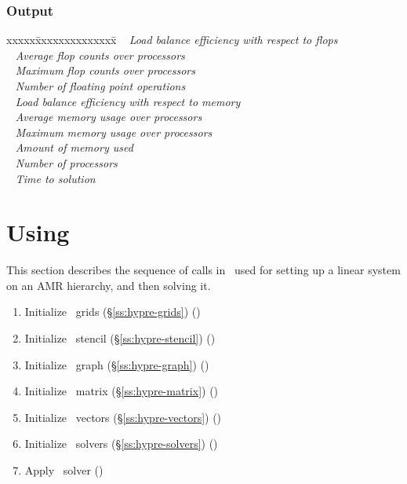 \documentclass[10pt]{article}
\begin{document}
\subsubsection{Output}  \label{sss:hypre-solve-output}

\begin{tabbing}
xxxxx\=xxxxxxxxxxxxxx\=\kill
\> \todo\  \>    \textit{Load balance efficiency with respect to flops}\\
\> \todo\  \> \textit{Average flop counts over processors} \\
\> \todo\  \> \textit{Maximum flop counts over processors} \\
\> \todo\  \> \textit{Number of floating point operations} \\
\> \todo\  \>    \textit{Load balance efficiency with respect to memory}\\
\> \todo\  \> \textit{Average memory usage over processors} \\
\> \todo\  \>    \textit{Maximum memory usage over processors} \\
\> \todo\  \> \textit{Amount of memory used} \\
\> \todo\  \> \textit{Number of processors} \\
\> \todo\  \>  \textit{Time to solution}
\end{tabbing}


\section{Using \hypre}

This section describes the sequence of calls in \hypre\ used for
setting up a linear system on an AMR hierarchy, and then solving it.

\begin{enumerate}
\item Initialize \hypre\ grids (\S\ref{ss:hypre-grids}) ()
\item Initialize \hypre\ stencil (\S\ref{ss:hypre-stencil}) ()
\item Initialize \hypre\ graph (\S\ref{ss:hypre-graph}) ()
\item Initialize \hypre\ matrix (\S\ref{ss:hypre-matrix}) ()
\item Initialize \hypre\ vectors (\S\ref{ss:hypre-vectors}) ()
\item Initialize \hypre\ solvers (\S\ref{ss:hypre-solvers}) ()
\item Apply \hypre\ solver ()
\end{enumerate}
\end{document}
